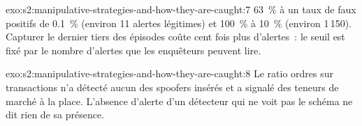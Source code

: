 \begin{solution}{exo:s2:manipulative-strategies-and-how-they-are-caught:7}
63~\% à un taux de faux positifs de 0.1~\% (environ 11 alertes légitimes) et 100~\% à 10~\% (environ 1\,150). Capturer le dernier tiers des épisodes coûte cent
fois plus d'alertes~: le seuil est fixé par le nombre d'alertes que les enquêteurs peuvent lire.
\end{solution}

\begin{solution}{exo:s2:manipulative-strategies-and-how-they-are-caught:8}
Le ratio ordres sur transactions n'a détecté aucun des spoofers insérés et a signalé des teneurs de marché à la place. L'absence d'alerte d'un détecteur qui ne voit pas le
schéma ne dit rien de sa présence.
\end{solution}

